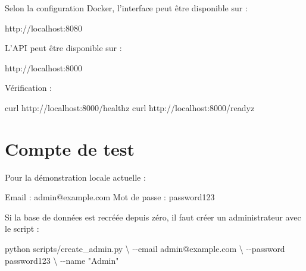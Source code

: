 \documentclass[
  french,
]{report}
\newenvironment{Shaded}{}{}
\newcommand{\AttributeTok}[1]{\textcolor[rgb]{0.49,0.56,0.16}{#1}}
\newcommand{\DataTypeTok}[1]{\textcolor[rgb]{0.56,0.13,0.00}{#1}}
\newcommand{\ExtensionTok}[1]{#1}
\newcommand{\NormalTok}[1]{#1}
\newcommand{\StringTok}[1]{\textcolor[rgb]{0.25,0.44,0.63}{#1}}
\begin{document}
Selon la configuration Docker, l'interface peut être disponible sur :

\begin{Shaded}
\begin{Highlighting}[]
\NormalTok{http://localhost:8080}
\end{Highlighting}
\end{Shaded}

L'API peut être disponible sur :

\begin{Shaded}
\begin{Highlighting}[]
\NormalTok{http://localhost:8000}
\end{Highlighting}
\end{Shaded}

Vérification :

\begin{Shaded}
\begin{Highlighting}[]
\ExtensionTok{curl}\NormalTok{ http://localhost:8000/healthz}
\ExtensionTok{curl}\NormalTok{ http://localhost:8000/readyz}
\end{Highlighting}
\end{Shaded}

\chapter{Compte de test}\label{compte-de-test}

Pour la démonstration locale actuelle :

\begin{Shaded}
\begin{Highlighting}[]
\NormalTok{Email : admin@example.com}
\NormalTok{Mot de passe : password123}
\end{Highlighting}
\end{Shaded}

Si la base de données est recréée depuis zéro, il faut créer un
administrateur avec le script :

\begin{Shaded}
\begin{Highlighting}[]
\ExtensionTok{python}\NormalTok{ scripts/create\_admin.py }\DataTypeTok{\textbackslash{}}
  \AttributeTok{{-}{-}email}\NormalTok{ admin@example.com }\DataTypeTok{\textbackslash{}}
  \AttributeTok{{-}{-}password}\NormalTok{ password123 }\DataTypeTok{\textbackslash{}}
  \AttributeTok{{-}{-}name} \StringTok{"Admin"}
\end{Highlighting}
\end{Shaded}
\end{document}
